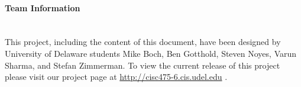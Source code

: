 \paragraph{Team Information  \\ \\} 

This project, including the content of this document, have been designed by University of Delaware students Mike Boch, Ben Gotthold, Steven Noyes, Varun Sharma, and Stefan Zimmerman. To view the current release of this project please visit our project page at \color{black}\url{http://cisc475-6.cis.udel.edu}
.
